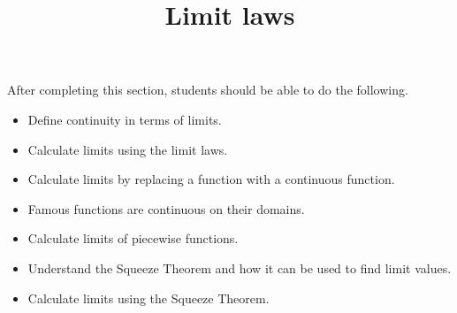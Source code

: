 \documentclass{ximera}
\title{Limit laws}
\begin{document}
\begin{abstract}
\end{abstract}

\maketitle

\begin{sectionOutcomes}
After completing this section, students should be able to do the following.

\begin{itemize}
\item Define continuity in terms of limits.
\item Calculate limits using the limit laws.
\item Calculate limits by replacing a function with a continuous function.
\item Famous functions are continuous on their domains. 
\item Calculate limits of piecewise functions.
\item Understand the Squeeze Theorem and how it can be used to find limit values.
\item Calculate limits using the Squeeze Theorem.
\end{itemize}
\end{sectionOutcomes}
\end{document}
